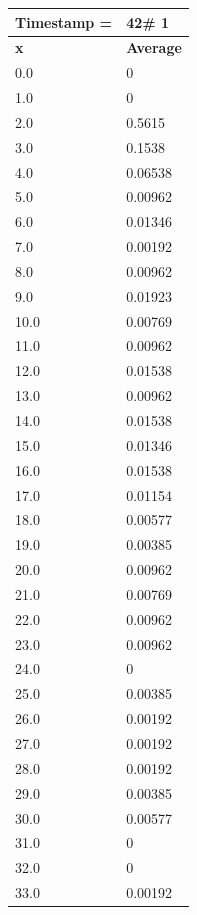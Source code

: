 \begin{tabular}{|l||l|}
\hline
\textbf{Timestamp =} & \textbf{42}\# 1\\\hline
	\textbf{x} & \textbf{Average} \\ \hline
\hline
	0.0 & 0 \\ \hline
	1.0 & 0 \\ \hline
	2.0 & 0.5615 \\ \hline
	3.0 & 0.1538 \\ \hline
	4.0 & 0.06538 \\ \hline
	5.0 & 0.00962 \\ \hline
	6.0 & 0.01346 \\ \hline
	7.0 & 0.00192 \\ \hline
	8.0 & 0.00962 \\ \hline
	9.0 & 0.01923 \\ \hline
	10.0 & 0.00769 \\ \hline
	11.0 & 0.00962 \\ \hline
	12.0 & 0.01538 \\ \hline
	13.0 & 0.00962 \\ \hline
	14.0 & 0.01538 \\ \hline
	15.0 & 0.01346 \\ \hline
	16.0 & 0.01538 \\ \hline
	17.0 & 0.01154 \\ \hline
	18.0 & 0.00577 \\ \hline
	19.0 & 0.00385 \\ \hline
	20.0 & 0.00962 \\ \hline
	21.0 & 0.00769 \\ \hline
	22.0 & 0.00962 \\ \hline
	23.0 & 0.00962 \\ \hline
	24.0 & 0 \\ \hline
	25.0 & 0.00385 \\ \hline
	26.0 & 0.00192 \\ \hline
	27.0 & 0.00192 \\ \hline
	28.0 & 0.00192 \\ \hline
	29.0 & 0.00385 \\ \hline
	30.0 & 0.00577 \\ \hline
	31.0 & 0 \\ \hline
	32.0 & 0 \\ \hline
	33.0 & 0.00192 \\ \hline
\end{tabular}
